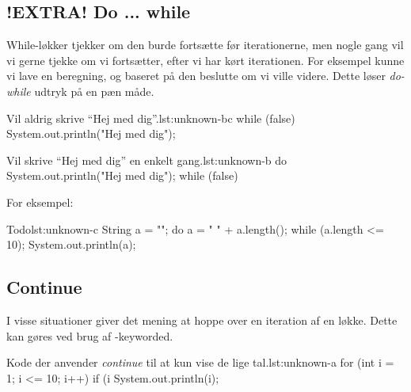 

	\subsection{!EXTRA! Do ... while}


		While-løkker tjekker om den burde fortsætte før iterationerne, men nogle
		gang vil vi gerne tjekke om vi fortsætter, efter vi har kørt
		iterationen. For eksempel kunne vi lave en beregning, og baseret på den
		beslutte om vi ville videre. Dette løser \emph{do-while} udtryk på en
		pæn måde.

		\begin{JavaCode}{Vil aldrig skrive ``Hej med dig''.}{lst:unknown-bc}
			while (false) {
				System.out.println("Hej med dig");
			}
		\end{JavaCode}

		\begin{JavaCode}{Vil skrive ``Hej med dig'' en enkelt gang.}{lst:unknown-b}
			do {
				System.out.println("Hej med dig");
			} while (false)
		\end{JavaCode}

		For eksempel:

		\begin{JavaCode}{Todo}{lst:unknown-c}
			String a = "";
			do {
				a = " " + a.length();
			} while (a.length <= 10);
			System.out.println(a);
		\end{JavaCode}


	\subsection{Continue}

		I visse situationer giver det mening at hoppe over en iteration af en
		løkke. Dette kan gøres ved brug af -keyworded.

		\begin{JavaCode}{Kode der anvender \emph{continue} til at kun vise de lige tal.}{lst:unknown-a}
			for (int i = 1; i <= 10; i++) {
				if (i %
				System.out.println(i);
			}
		\end{JavaCode}

